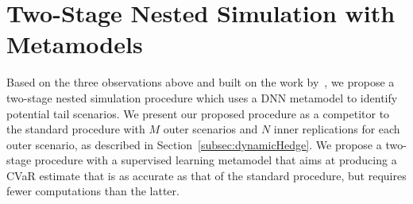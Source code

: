 \section{Two-Stage Nested Simulation with Metamodels} \label{sec2:metamodel2Stage}

Based on the three observations above and built on the work by~\cite{dang2020efficient}, we propose a two-stage nested simulation procedure which uses a DNN metamodel to identify potential tail scenarios.
We present our proposed procedure as a competitor to the standard procedure with $M$ outer scenarios and $N$ inner replications for each outer scenario, as described in Section~\ref{subsec:dynamicHedge}.
We propose a two-stage procedure with a supervised learning metamodel that aims at producing a CVaR estimate that is as accurate as that of the standard procedure, but requires fewer computations than the latter.

